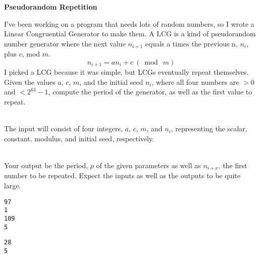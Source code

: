 \documentclass[12pt]{article}
\begin{document}
\begin{center}
   \Large\textbf{Pseudorandom Repetition}
\end{center}

I've been working on a program that needs lots of random numbers, so I wrote a Linear Congruential Generator to make them. A LCG is a kind of pseudorandom number generator where the next value \(n_{i+1}\) equals a times the previous n, \(n_i\), plus \(c\), mod \(m\).
\[n_{i+1} = a n_i + c~(\bmod~m)\]
I picked a LCG because it was simple, but LCGs eventually repeat themselves. Given the values \(a\), \(c\), \(m\), and the initial seed \(n_i\), where all four numbers are \(>0\) and \(<2^{63}-1\), compute the period of the generator, as well as the first value to repeat.

\vspace*{.3in} \\

The input will consist of four integers, \(a\), \(c\), \(m\), and \(n_i\), representing the scalar, constant, modulus, and initial seed, respectively.

\vspace*{.3in} \\

Your output be the period, \(p\) of the given parameters as well as \(n_{i+x}\), the first number to be repeated. Expect the inputs as well as the outputs to be quite large.

\vspace*{.3in} 
\begin{verbatim}
97
1
109
5
\end{verbatim}

\vspace*{.3in} 
\begin{verbatim}
28
5
\end{verbatim}
\end{document}
